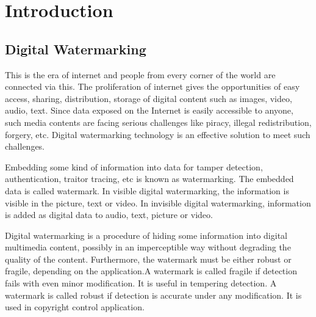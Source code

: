 \documentclass[12pt,a4paper]{report}
\begin{document}
%





\tableofcontents

\listoffigures

\listoftables

\chapter{Introduction}

\setcounter{page}{1}

\section{Digital Watermarking}

This is the era of internet and people from every corner of the world are connected via this. The proliferation of internet gives the opportunities of easy access, sharing, distribution, storage of digital content such as images, video, audio, text. Since data exposed on the Internet is easily accessible to anyone, such media contents are facing serious challenges like piracy, illegal redistribution, forgery, etc. Digital watermarking technology is an effective solution to meet such challenges.

\bigskip

Embedding some kind of information into data for tamper detection, authentication, traitor tracing, etc is known as watermarking. The embedded data is called watermark. In visible digital watermarking, the information is visible in the picture, text or video. In invisible digital watermarking, information is added as digital data to audio, text, picture or video.

\bigskip

Digital watermarking is a procedure of hiding some information into digital multimedia content, possibly in an imperceptible way without degrading the quality of the content. Furthermore, the watermark must be either robust or fragile, depending on the application.A watermark is called fragile if detection fails with even minor modification. It is useful in tempering detection. A watermark is called robust if detection is accurate under any modification. It is used in copyright control application.
\end{document}
